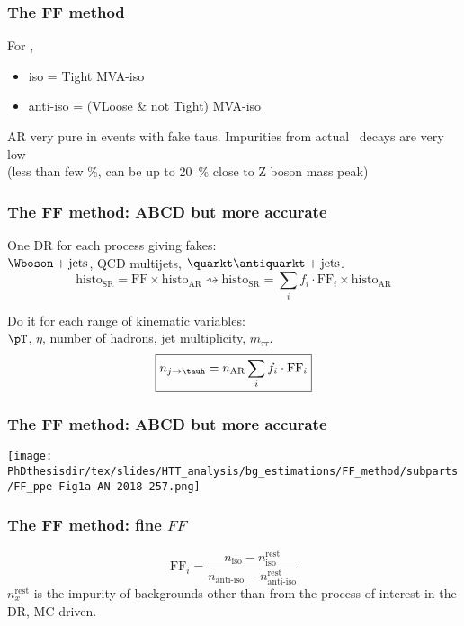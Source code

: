 \begin{frame}
\frametitle{The FF method}

For \tauh,
\begin{itemize}
\item iso = Tight MVA-iso
\item anti-iso = (VLoose \& not Tight) MVA-iso
\end{itemize}

\manip AR very pure in events with fake taus.
\manip Impurities from actual \tauh\ decays are very low\\(less than few \%, can be up to \SI{20}{\%} close to Z boson mass peak)
\end{frame}

\begin{frame}
\frametitle{The FF method: ABCD but more accurate}
\manip One DR for each process giving fakes:\\$\Wboson+\text{jets}$, QCD multijets, $\quarkt\antiquarkt+\text{jets}$.
\begin{equation*}
\text{histo}_\text{SR} = \mathrm{FF} \times \text{histo}_\text{AR}
\rightsquigarrow
\text{histo}_\text{SR} =\sum_i f_i \cdot \mathrm{FF}_i \times \text{histo}_\text{AR}
\end{equation*}

\manip Do it for each range of kinematic variables:\\
\qquad $\pT$, $\eta$, number of hadrons, jet multiplicity, $m_{\tau\tau}$.
\begin{equation*}
\boxed{n_{j\to\tauh} = n_\text{AR}\sum_i f_i \cdot \mathrm{FF}_i}
\end{equation*}
\end{frame}

\begin{frame}
\frametitle{The FF method: ABCD but more accurate}
\begin{center}
\texttt{[image: \\PhDthesisdir/tex/slides/HTT\_analysis/bg\_estimations/FF\_method/subparts/FF\_ppe-Fig1a-AN-2018-257.png]}
\end{center}
\end{frame}

\begin{frame}
\frametitle{The FF method: fine $\mathit{FF}$}

\begin{equation*}
\mathrm{FF}_i = \frac{n_\text{iso} - n_\text{iso}^\text{rest}}{n_\text{anti-iso} - n_\text{anti-iso}^\text{rest}}
\end{equation*}
$n_x^\text{rest}$ is the impurity of backgrounds other than from the process-of-interest in the DR, MC-driven.
\end{frame}